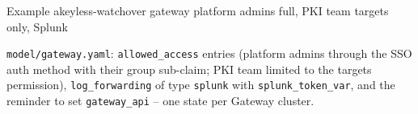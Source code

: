 \begin{session}{Example}
\you akeyless-watchover gateway platform admins full, PKI team targets only, Splunk

\agent \texttt{model/gateway.yaml}: \texttt{allowed\_access} entries (platform admins through the SSO
auth method with their group sub-claim; PKI team limited to the targets permission),
\texttt{log\_forwarding} of type \texttt{splunk} with \texttt{splunk\_token\_var}, and the reminder to set
\texttt{gateway\_api} -- one state per Gateway cluster.
\end{session}
